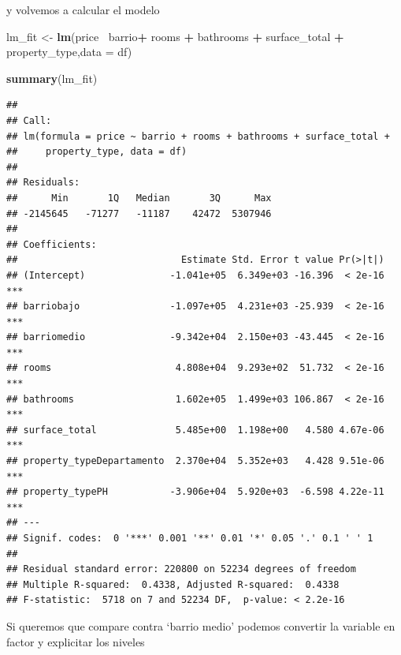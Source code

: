\documentclass[]{book}
\newenvironment{Shaded}{\begin{snugshade}}{\end{snugshade}}
\newcommand{\DataTypeTok}[1]{\textcolor[rgb]{0.13,0.29,0.53}{#1}}
\newcommand{\KeywordTok}[1]{\textcolor[rgb]{0.13,0.29,0.53}{\textbf{#1}}}
\newcommand{\NormalTok}[1]{#1}
\newcommand{\OperatorTok}[1]{\textcolor[rgb]{0.81,0.36,0.00}{\textbf{#1}}}
\newcommand{\StringTok}[1]{\textcolor[rgb]{0.31,0.60,0.02}{#1}}
\begin{document}
y volvemos a calcular el modelo

\begin{Shaded}
\begin{Highlighting}[]
\NormalTok{lm_fit <-}\StringTok{ }\KeywordTok{lm}\NormalTok{(price}\OperatorTok{~}\StringTok{ }\NormalTok{barrio}\OperatorTok{+}\StringTok{ }\NormalTok{rooms }\OperatorTok{+}\StringTok{ }\NormalTok{bathrooms }\OperatorTok{+}\StringTok{ }\NormalTok{surface_total }\OperatorTok{+}\StringTok{ }\NormalTok{property_type,}\DataTypeTok{data =}\NormalTok{ df)}

\KeywordTok{summary}\NormalTok{(lm_fit)}
\end{Highlighting}
\end{Shaded}

\begin{verbatim}
## 
## Call:
## lm(formula = price ~ barrio + rooms + bathrooms + surface_total + 
##     property_type, data = df)
## 
## Residuals:
##      Min       1Q   Median       3Q      Max 
## -2145645   -71277   -11187    42472  5307946 
## 
## Coefficients:
##                             Estimate Std. Error t value Pr(>|t|)    
## (Intercept)               -1.041e+05  6.349e+03 -16.396  < 2e-16 ***
## barriobajo                -1.097e+05  4.231e+03 -25.939  < 2e-16 ***
## barriomedio               -9.342e+04  2.150e+03 -43.445  < 2e-16 ***
## rooms                      4.808e+04  9.293e+02  51.732  < 2e-16 ***
## bathrooms                  1.602e+05  1.499e+03 106.867  < 2e-16 ***
## surface_total              5.485e+00  1.198e+00   4.580 4.67e-06 ***
## property_typeDepartamento  2.370e+04  5.352e+03   4.428 9.51e-06 ***
## property_typePH           -3.906e+04  5.920e+03  -6.598 4.22e-11 ***
## ---
## Signif. codes:  0 '***' 0.001 '**' 0.01 '*' 0.05 '.' 0.1 ' ' 1
## 
## Residual standard error: 220800 on 52234 degrees of freedom
## Multiple R-squared:  0.4338, Adjusted R-squared:  0.4338 
## F-statistic:  5718 on 7 and 52234 DF,  p-value: < 2.2e-16
\end{verbatim}

Si queremos que compare contra `barrio medio' podemos convertir la variable en factor y explicitar los niveles

\begin{Shaded}
\end{Shaded}
\end{document}
